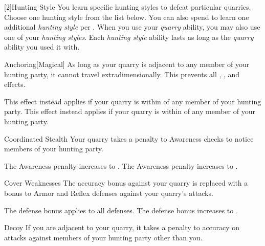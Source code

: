         [2]{Hunting Style}
        You learn specific hunting styles to defeat particular quarries.
        Choose one hunting style from the list below.
        You can also spend  to learn one additional \textit{hunting style} per .
        When you use your \textit{quarry} ability, you may also use one of your \textit{hunting styles}.
        Each \textit{hunting style} ability lasts as long as the \textit{quarry} ability you used it with.
        {
            \begin{freeability}{Anchoring}[Magical]
                As long as your quarry is adjacent to any member of your hunting party, it cannot travel extradimensionally.
                This prevents all , , and  effects.

                \rankline
                 This effect instead applies if your quarry is within \medrange of any member of your hunting party.
                 This effect instead applies if your quarry is within \distrange of any member of your hunting party.
            \end{freeability}

            \begin{freeability}{Coordinated Stealth}
                Your quarry takes a  penalty to Awareness checks to notice members of your hunting party.

                \rankline
                 The Awareness penalty increases to .
                 The Awareness penalty increases to .
            \end{freeability}

            \begin{freeability}{Cover Weaknesses}
                The accuracy bonus against your quarry is replaced with a  bonus to Armor and Reflex defenses against your quarry's attacks.

                \rankline
                 The defense bonus applies to all defenses.
                 The defense bonus increases to .
            \end{freeability}

            \begin{freeability}{Decoy}
                If you are adjacent to your quarry, it takes a  penalty to accuracy on attacks against members of your hunting party other than you.


\end{freeability}}
